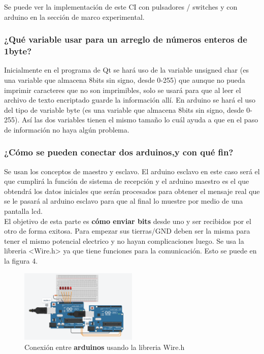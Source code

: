 \documentclass{article}
\begin{document}
Se puede ver la implementación de este CI con pulsadores / switches y con arduino en la sección de marco experimental.

\subsubsection*{¿Qué variable usar para un arreglo de números enteros de 1byte?}
Inicialmente en el programa de Qt se hará uso de la variable unsigned char (es una variable que almacena 8bits sin signo, desde 0-255) que aunque no pueda imprimir caracteres que no son imprimibles, solo se usará para que al leer el archivo de texto encriptado guarde la información allí. En arduino se hará el uso del tipo de variable byte (es una variable que almacena 8bits sin signo, desde 0-255). Así las dos variables tienen el mismo tamaño lo cuál ayuda a que en el paso de información no haya algún problema.

\subsubsection*{¿Cómo se pueden conectar dos arduinos,y con qué fin?}
Se usan los conceptos de maestro y esclavo. El arduino esclavo en este caso será el que cumplirá la función de sistema de recepción y el arduino maestro es el que obtendrá los datos iniciales que serán procesados para obtener el mensaje real que se le pasará al arduino esclavo para que al final lo muestre por medio de una pantalla lcd.
\\[0.2cm]
El objetivo de esta parte es \textbf{cómo enviar bits} \cite{conexion_dos_arduinos} desde uno y ser recibidos por el otro
de forma exitosa.
Para empezar sus tierras/GND deben ser la misma para tener el mismo potencial electrico y no hayan complicaciones luego. Se usa la libreria <Wire.h> ya que tiene funciones para la comunicación. Esto se puede en la figura 4.

\begin{figure}[!ht]
\caption{Conexión entre  \textbf{arduinos} \cite{conexion_dos_arduinos} usando la libreria Wire.h}
\centering
\includegraphics[width=0.5\textwidth]{conexion_arduinos.png}
\end{figure}
\end{document}
